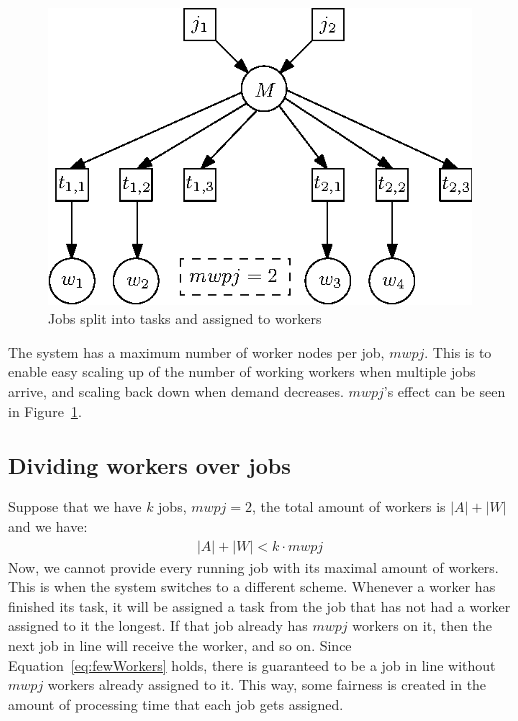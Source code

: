 \begin{figure}[ht!]
    \center
    \includegraphics{./img/splitjobtotasks.eps}
    \caption{Jobs split into tasks and assigned to workers}
    \label{fig:splitjobtotasks}
\end{figure}

The system has a maximum number of worker nodes per job, $mwpj$.
This is to enable easy scaling up of the number of working workers when multiple jobs arrive, and scaling back down when demand decreases.
$mwpj$'s effect can be seen in Figure~\ref{fig:splitjobtotasks}.

\subsection{Dividing workers over jobs}
Suppose that we have $k$ jobs, $mwpj = 2$, the total amount of workers is $|A| + |W|$ and we have:
\begin{align}|A|+|W| < k \cdot mwpj \label{eq:fewWorkers}\end{align}
Now, we cannot provide every running job with its maximal amount of workers.
This is when the system switches to a different scheme.
Whenever a worker has finished its task, it will be assigned a task from the job that has not had a worker assigned to it the longest.
If that job already has $mwpj$ workers on it, then the next job in line will receive the worker, and so on.
Since Equation~\ref{eq:fewWorkers} holds, there is guaranteed to be a job in line without $mwpj$ workers already assigned to it.
This way, some fairness is created in the amount of processing time that each job gets assigned.